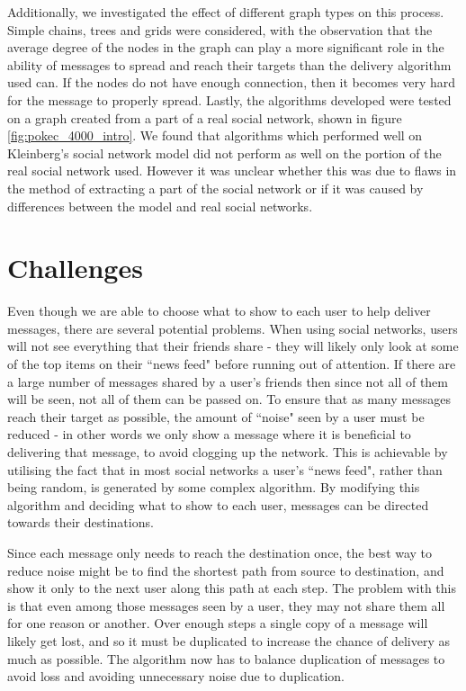 \documentclass[bsc,frontabs,twoside,singlespacing,parskip,deptreport]{infthesis}     %
\begin{document}
Additionally, we investigated the effect of different graph types on this process. Simple chains, trees and grids were considered, with the observation that the average degree of the nodes in the graph can play a more significant role in the ability of messages to spread and reach their targets than the delivery algorithm used can. If the nodes do not have enough connection, then it becomes very hard for the message to properly spread. Lastly, the algorithms developed were tested on a graph created from a part of a real social network, shown in figure \ref{fig:pokec_4000_intro}. We found that algorithms which performed well on Kleinberg's social network model did not perform as well on the portion of the real social network used. However it was unclear whether this was due to flaws in the method of extracting a part of the social network or if it was caused by differences between the model and real social networks.


\section{Challenges}
Even though we are able to choose what to show to each user to help deliver messages, there are several potential problems. When using social networks, users will not see everything that their friends share - they will likely only look at some of the top items on their ``news feed" before running out of attention. If there are a large number of messages shared by a user's friends then since not all of them will be seen, not all of them can be passed on. To ensure that as many messages reach their target as possible, the amount of ``noise" seen by a user must be reduced - in other words we only show a message  where it is beneficial to delivering that message, to avoid clogging up the network. This is achievable by utilising the fact that in most social networks a user's ``news feed", rather than being random, is generated by some complex algorithm. By modifying this algorithm and deciding what to show to each user, messages can be directed towards their destinations.

Since each message only needs to reach the destination once, the best way to reduce noise might be to find the shortest path from source to destination, and show it only to the next user along this path at each step. The problem with this is that even among those messages seen by a user, they may not share them all for one reason or another. Over enough steps a single copy of a message will likely get lost, and so it must be duplicated to increase the chance of delivery as much as possible. The algorithm now has to balance duplication of messages to avoid loss and avoiding unnecessary noise due to duplication.
\end{document}
